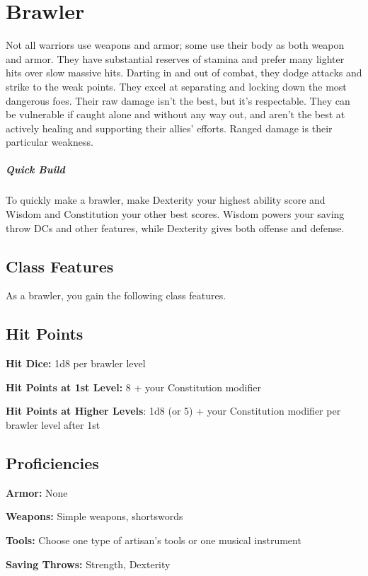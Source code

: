 \section{Brawler\label{class:brawler}}

Not all warriors use weapons and armor; some use their body as both weapon and armor. They have substantial reserves of stamina and prefer many lighter hits over slow massive hits. Darting in and out of combat, they dodge attacks and strike to the weak points. They excel at separating and locking down the most dangerous foes. Their raw damage isn't the best, but it's respectable. They can be vulnerable if caught alone and without any way out, and aren't the best at actively healing and supporting their allies' efforts. Ranged damage is their particular weakness.

\subparagraph*{Quick Build}
To quickly make a brawler, make Dexterity your highest ability score and Wisdom and Constitution your other best scores. Wisdom powers your saving throw DCs and other features, while Dexterity gives both offense and defense. 

\subsection{Class Features}

As a brawler, you gain the following class features.

\subsection{Hit Points}

\textbf{Hit Dice:} 1d8 per brawler level

\textbf{Hit Points at 1st Level:} 8 + your Constitution modifier

\textbf{Hit Points at Higher Levels}: 1d8 (or 5) + your Constitution modifier per brawler level after 1st

\subsection{Proficiencies}

\textbf{Armor:} None

\textbf{Weapons:} Simple weapons, shortswords

\textbf{Tools:} Choose one type of artisan's tools or one musical instrument

\textbf{Saving Throws:} Strength, Dexterity

